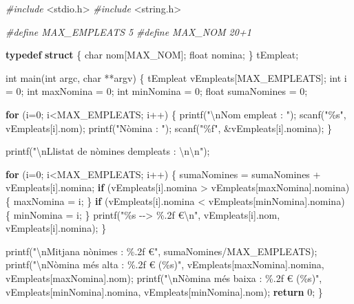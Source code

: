 \documentclass[
]{book}
\newenvironment{Shaded}{\begin{snugshade}}{\end{snugshade}}
\newcommand{\ControlFlowTok}[1]{\textcolor[rgb]{0.13,0.29,0.53}{\textbf{#1}}}
\newcommand{\DataTypeTok}[1]{\textcolor[rgb]{0.13,0.29,0.53}{#1}}
\newcommand{\DecValTok}[1]{\textcolor[rgb]{0.00,0.00,0.81}{#1}}
\newcommand{\ImportTok}[1]{#1}
\newcommand{\KeywordTok}[1]{\textcolor[rgb]{0.13,0.29,0.53}{\textbf{#1}}}
\newcommand{\NormalTok}[1]{#1}
\newcommand{\PreprocessorTok}[1]{\textcolor[rgb]{0.56,0.35,0.01}{\textit{#1}}}
\newcommand{\SpecialCharTok}[1]{\textcolor[rgb]{0.00,0.00,0.00}{#1}}
\newcommand{\StringTok}[1]{\textcolor[rgb]{0.31,0.60,0.02}{#1}}
\begin{document}
\begin{Shaded}
\begin{Highlighting}[]
\PreprocessorTok{\#include }\ImportTok{\textless{}stdio.h\textgreater{}}
\PreprocessorTok{\#include }\ImportTok{\textless{}string.h\textgreater{}}

\PreprocessorTok{\#define MAX\_EMPLEATS 5}
\PreprocessorTok{\#define MAX\_NOM 20+1}

\KeywordTok{typedef} \KeywordTok{struct}\NormalTok{ \{}
    \DataTypeTok{char}\NormalTok{ nom[MAX\_NOM];}
    \DataTypeTok{float}\NormalTok{ nomina;}
\NormalTok{\} tEmpleat;}

\DataTypeTok{int}\NormalTok{ main(}\DataTypeTok{int}\NormalTok{ argc, }\DataTypeTok{char}\NormalTok{ **argv) \{}
\NormalTok{    tEmpleat vEmpleats[MAX\_EMPLEATS];}
    \DataTypeTok{int}\NormalTok{ i = }\DecValTok{0}\NormalTok{;}
    \DataTypeTok{int}\NormalTok{ maxNomina = }\DecValTok{0}\NormalTok{;}
    \DataTypeTok{int}\NormalTok{ minNomina = }\DecValTok{0}\NormalTok{;}
    \DataTypeTok{float}\NormalTok{ sumaNomines = }\DecValTok{0}\NormalTok{;}

    \ControlFlowTok{for}\NormalTok{ (i=}\DecValTok{0}\NormalTok{; i\textless{}MAX\_EMPLEATS; i++) \{}
\NormalTok{        printf(}\StringTok{"}\SpecialCharTok{\textbackslash{}n}\StringTok{Nom empleat : "}\NormalTok{);}
\NormalTok{        scanf(}\StringTok{"\%s"}\NormalTok{, vEmpleats[i].nom);}
\NormalTok{        printf(}\StringTok{"Nòmina : "}\NormalTok{);}
\NormalTok{        scanf(}\StringTok{"\%f"}\NormalTok{, \&vEmpleats[i].nomina);}
\NormalTok{     \}}

\NormalTok{     printf(}\StringTok{"}\SpecialCharTok{\textbackslash{}n}\StringTok{Llistat de nòmines d\textquotesingle{}empleats : }\SpecialCharTok{\textbackslash{}n\textbackslash{}n}\StringTok{"}\NormalTok{);}

     \ControlFlowTok{for}\NormalTok{ (i=}\DecValTok{0}\NormalTok{; i\textless{}MAX\_EMPLEATS; i++) \{}
\NormalTok{        sumaNomines = sumaNomines + vEmpleats[i].nomina;}
        \ControlFlowTok{if}\NormalTok{ (vEmpleats[i].nomina \textgreater{} vEmpleats[maxNomina].nomina) \{}
\NormalTok{            maxNomina = i;}
\NormalTok{        \}}
        \ControlFlowTok{if}\NormalTok{ (vEmpleats[i].nomina \textless{} vEmpleats[minNomina].nomina) \{}
\NormalTok{            minNomina = i;}
\NormalTok{        \}}
\NormalTok{        printf(}\StringTok{"\%s {-}{-}\textgreater{} \%.2f €}\SpecialCharTok{\textbackslash{}n}\StringTok{"}\NormalTok{, vEmpleats[i].nom, vEmpleats[i].nomina);}
\NormalTok{    \}}

\NormalTok{    printf(}\StringTok{"}\SpecialCharTok{\textbackslash{}n}\StringTok{Mitjana nònimes : \%.2f €"}\NormalTok{, sumaNomines/MAX\_EMPLEATS);}
\NormalTok{    printf(}\StringTok{"}\SpecialCharTok{\textbackslash{}n}\StringTok{Nòmina més alta : \%.2f € (\%s)"}\NormalTok{, vEmpleats[maxNomina].nomina, vEmpleats[maxNomina].nom);}
\NormalTok{    printf(}\StringTok{"}\SpecialCharTok{\textbackslash{}n}\StringTok{Nòmina més baixa : \%.2f € (\%s)"}\NormalTok{, vEmpleats[minNomina].nomina, vEmpleats[minNomina].nom);}
    \ControlFlowTok{return} \DecValTok{0}\NormalTok{;}
\NormalTok{\}}
\end{Highlighting}
\end{Shaded}
\end{document}
